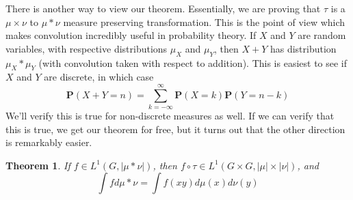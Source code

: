 \documentclass{article}
\theoremstyle{plain}
\newtheorem{theorem}{Theorem}
\theoremstyle{definition}
\begin{document}
There is another way to view our theorem. Essentially, we are proving that $\tau$ is a $\mu \times \nu$ to $\mu * \nu$ measure preserving transformation. This is the point of view which makes convolution incredibly useful in probability theory. If $X$ and $Y$ are random variables, with respective distributions $\mu_X$ and $\mu_Y$, then $X + Y$ has distribution $\mu_X * \mu_Y$ (with convolution taken with respect to addition). This is easiest to see if $X$ and $Y$ are discrete, in which case
%
\[ \mathbf{P}(X + Y = n) = \sum_{k = -\infty}^\infty \mathbf{P}(X = k) \mathbf{P}(Y = n-k) \]
%
We'll verify this is true for non-discrete measures as well. If we can verify that this is true, we get our theorem for free, but it turns out that the other direction is remarkably easier.

\begin{theorem}
    If $f \in L^1(G, |\mu * \nu|)$, then $f \circ \tau \in L^1(G \times G, |\mu| \times |\nu|)$, and
    \[ \int f d\mu * \nu = \int f(xy) d\mu(x) d\nu(y) \]
\end{theorem}
\end{document}

